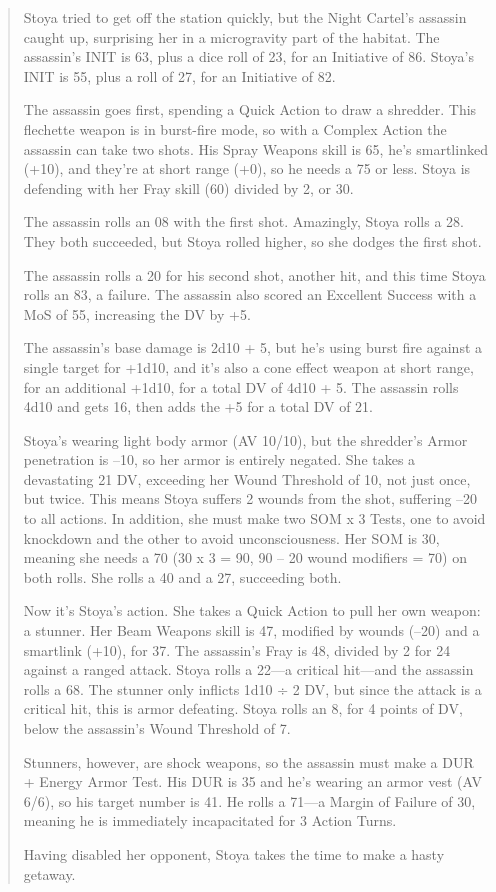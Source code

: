 \begin{quotation}
Stoya tried to get off the station quickly, but the Night Cartel’s assassin caught up, surprising her in a microgravity part of the habitat. The assassin’s INIT is 63, plus a dice roll of 23, for an Initiative of 86. Stoya’s INIT is 55, plus a roll of 27, for an Initiative of 82.

The assassin goes first, spending a Quick Action to draw a shredder. This flechette weapon is in burst-fire mode, so with a Complex Action the assassin can take two shots. His Spray Weapons skill is 65, he’s smartlinked (+10), and they’re at short range (+0), so he needs a 75 or less. Stoya is defending with her Fray skill (60) divided by 2, or 30.

The assassin rolls an 08 with the first shot. Amazingly, Stoya rolls a 28. They both succeeded, but Stoya rolled higher, so she dodges the first shot.

The assassin rolls a 20 for his second shot, another hit, and this time Stoya rolls an 83, a failure. The assassin also scored an Excellent Success with a MoS of 55, increasing the DV by +5.

The assassin’s base damage is 2d10 + 5, but he’s using burst fire against a single target for +1d10, and it’s also a cone effect weapon at short range, for an additional +1d10, for a total DV of 4d10 + 5. The assassin rolls 4d10 and gets 16, then adds the +5 for a total DV of 21.

Stoya’s wearing light body armor (AV 10/10), but the shredder’s Armor penetration is –10, so her armor is entirely negated. She takes a devastating 21 DV, exceeding her Wound Threshold of 10, not just once, but twice. This means Stoya suffers 2 wounds from the shot, suffering –20 to all actions. In addition, she must make two SOM x 3 Tests, one to avoid knockdown and the other to avoid unconsciousness. Her SOM is 30, meaning she needs a 70 (30 x 3 = 90, 90 – 20 wound modifiers = 70) on both rolls. She rolls a 40 and a 27, succeeding both.

Now it’s Stoya’s action. She takes a Quick Action to pull her own weapon: a stunner. Her Beam Weapons skill is 47, modified by wounds (–20) and a smartlink (+10), for 37. The assassin’s Fray is 48, divided by 2 for 24 against a ranged attack. Stoya rolls a 22—a critical hit—and the assassin rolls a 68. The stunner only inflicts 1d10 ÷ 2 DV, but since the attack is a critical hit, this is armor defeating. Stoya rolls an 8, for 4 points of DV, below the assassin’s Wound Threshold of 7.

Stunners, however, are shock weapons, so the assassin must make a DUR + Energy Armor Test. His DUR is 35 and he’s wearing an armor vest (AV 6/6), so his target number is 41. He rolls a 71—a Margin of Failure of 30, meaning he is immediately incapacitated for 3 Action Turns.

Having disabled her opponent, Stoya takes the time to make a hasty getaway.
\end{quotation}


